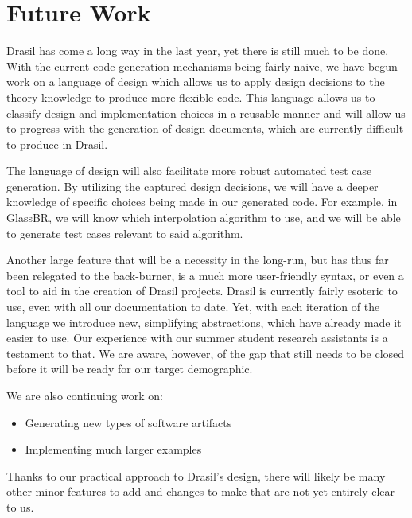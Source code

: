 \documentclass[sigconf]{acmart}
\newcommand{\authornt}[3]{\textcolor{#1}{[#3 ---#2]}}
\newcommand{\authornt}[3]{}
\newcommand{\spr}[1]{\authornt{green}{SP}{#1}} %
\begin{document}
{\section{Future Work} \label{SecFuture}

Drasil has come a long way in the last year, yet there is still much to be 
done. With the current code-generation mechanisms being fairly naive, we have 
begun work on a language of design which allows us to apply design decisions to 
the theory knowledge to produce more flexible code. This language allows us to 
classify design and implementation choices in a reusable manner and will 
allow us to progress with the generation of design documents, which are 
currently difficult to produce in Drasil.

The language of design will also facilitate more robust automated test case 
generation. By utilizing the captured design decisions, we will have a deeper 
knowledge of specific choices being made in our generated code. For example, in 
GlassBR, we will know which interpolation algorithm to use, and we will be able 
to generate test cases relevant to said algorithm.


Another large feature that will be a necessity in the long-run, but has thus 
far been relegated to the back-burner, is a much more user-friendly syntax, or 
even a tool to aid in the creation of Drasil projects. Drasil is currently
fairly esoteric to use, even with all our documentation to date. Yet, with 
each iteration of the language we introduce new, simplifying abstractions, 
which have already made it easier to use. Our experience with our summer student 
research assistants is a testament to that. We are aware, however, of the gap 
that still needs to be closed before it will be ready for our target 
demographic.

We are also continuing work on:
\begin{itemize}
    \item Generating new types of software artifacts
    \item Implementing much larger examples
\end{itemize}

Thanks to our practical approach to Drasil's design, there will likely be many 
other minor features to add and changes to make that are not yet entirely clear 
to us.

}
\end{document}
